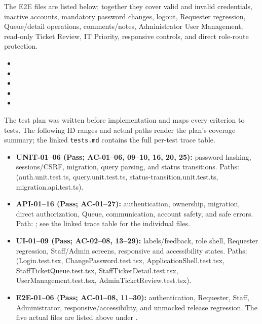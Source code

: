 \documentclass[10pt,a4paper]{article}
\begin{document}
The E2E files are listed below; together they cover valid and invalid
credentials, inactive accounts, mandatory password changes, logout, Requester
regression, Queue/detail operations, comments/notes, Administrator User
Management, read-only Ticket Review, IT Priority, responsive controls, and
direct role-route protection.

\begin{itemize}
  \item {}
  \item {}
  \item {}
  \item {}
  \item {}
\end{itemize}

The test plan was written before implementation and maps every criterion to
tests. The following ID ranges and actual paths render the plan's coverage
summary; the linked \texttt{tests.md} contains the full per-test trace table.

{\small
\begin{itemize}
  \item \textbf{UNIT-01--06 (Pass; AC-01--06, 09--10, 16, 20, 25):} password hashing, sessions/CSRF, migration, query parsing, and status transitions. Paths:  (auth.unit.test.ts, query.unit.test.ts, status-transition.unit.test.ts, migration.api.test.ts).
  \item \textbf{API-01--16 (Pass; AC-01--27):} authentication, ownership, migration, direct authorization, Queue, communication, account safety, and safe errors. Path: ; see the linked trace table for the individual files.
  \item \textbf{UI-01--09 (Pass; AC-02--08, 13--29):} labels/feedback, role shell, Requester regression, Staff/Admin screens, responsive and accessibility states. Paths:  (Login.test.tsx, ChangePassword.test.tsx, ApplicationShell.test.tsx, StaffTicketQueue.test.tsx, StaffTicketDetail.test.tsx, UserManagement.test.tsx, AdminTicketReview.test.tsx).
  \item \textbf{E2E-01--06 (Pass; AC-01--08, 11--30):} authentication, Requester, Staff, Administrator, responsive/accessibility, and unmocked release regression. The five actual files are listed above under .
\end{itemize}
}
\end{document}
